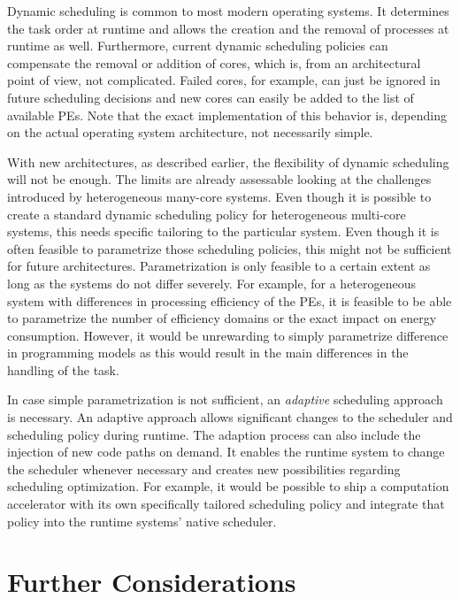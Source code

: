 Dynamic scheduling is common to most modern operating systems. It determines the task order at runtime and allows the creation and the removal of processes at runtime as well. Furthermore, current dynamic scheduling policies can compensate the removal or addition of cores, which is, from an architectural point of view, not complicated. Failed cores, for example, can just be ignored in future scheduling decisions and new cores can easily be added to the list of available \acp{PE}. Note that the exact implementation of this behavior is, depending on the actual operating system architecture, not necessarily simple.

With new architectures, as described earlier, the flexibility of dynamic scheduling will not be enough. The limits are already assessable looking at the challenges introduced by heterogeneous many-core systems. Even though it is possible to create a standard dynamic scheduling policy for heterogeneous multi-core systems, this needs specific tailoring to the particular system. Even though it is often feasible to parametrize those scheduling policies, this might not be sufficient for future architectures. Parametrization is only feasible to a certain extent as long as the systems do not differ severely. For example, for a heterogeneous system with differences in processing efficiency of the \acp{PE}, it is feasible to be able to parametrize the number of efficiency domains or the exact impact on energy consumption. However, it would be unrewarding to simply parametrize difference in programming models as this would result in the main differences in the handling of the task.

In case simple parametrization is not sufficient, an \emph{adaptive} scheduling approach is necessary. An adaptive approach allows significant changes to the scheduler and scheduling policy during runtime. The adaption process can also include the injection of new code paths on demand. It enables the runtime system to change the scheduler whenever necessary and creates new possibilities regarding scheduling optimization. For example, it would be possible to ship a computation accelerator with its own specifically tailored scheduling policy and integrate that policy into the runtime systems' native scheduler.

\section{Further Considerations}%
\label{sec:further_considerations}

